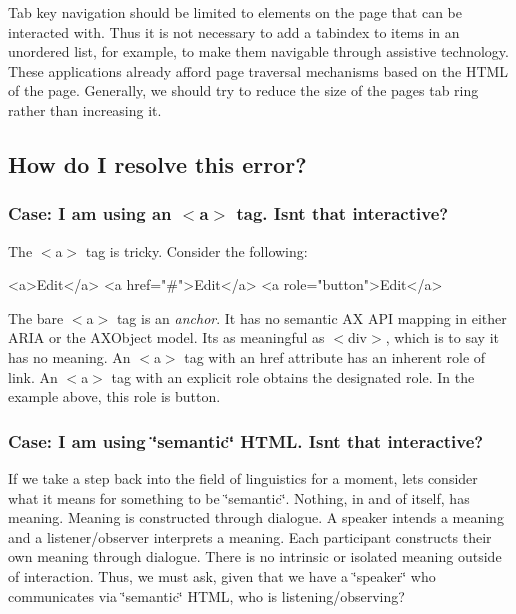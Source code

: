 Tab key navigation should be limited to elements on the page that can be interacted with. Thus it is not necessary to add a tabindex to items in an unordered list, for example, to make them navigable through assistive technology. These applications already afford page traversal mechanisms based on the H\+T\+ML of the page. Generally, we should try to reduce the size of the page\textquotesingle{}s tab ring rather than increasing it.

\subsection*{How do I resolve this error?}

\subsubsection*{Case\+: I am using an {\ttfamily $<$a$>$} tag. Isn\textquotesingle{}t that interactive?}

The {\ttfamily $<$a$>$} tag is tricky. Consider the following\+:


\begin{DoxyCode}
<a>Edit</a>
<a href="#">Edit</a>
<a role="button">Edit</a>
\end{DoxyCode}


The bare {\ttfamily $<$a$>$} tag is an {\itshape anchor}. It has no semantic AX A\+PI mapping in either A\+R\+IA or the A\+X\+Object model. It\textquotesingle{}s as meaningful as {\ttfamily $<$div$>$}, which is to say it has no meaning. An {\ttfamily $<$a$>$} tag with an {\ttfamily href} attribute has an inherent role of {\ttfamily link}. An {\ttfamily $<$a$>$} tag with an explicit role obtains the designated role. In the example above, this role is {\ttfamily button}.

\subsubsection*{Case\+: I am using \char`\"{}semantic\char`\"{} H\+T\+ML. Isn\textquotesingle{}t that interactive?}

If we take a step back into the field of linguistics for a moment, let\textquotesingle{}s consider what it means for something to be \char`\"{}semantic\char`\"{}. Nothing, in and of itself, has meaning. Meaning is constructed through dialogue. A speaker intends a meaning and a listener/observer interprets a meaning. Each participant constructs their own meaning through dialogue. There is no intrinsic or isolated meaning outside of interaction. Thus, we must ask, given that we have a \char`\"{}speaker\char`\"{} who communicates via \char`\"{}semantic\char`\"{} H\+T\+ML, who is listening/observing?

